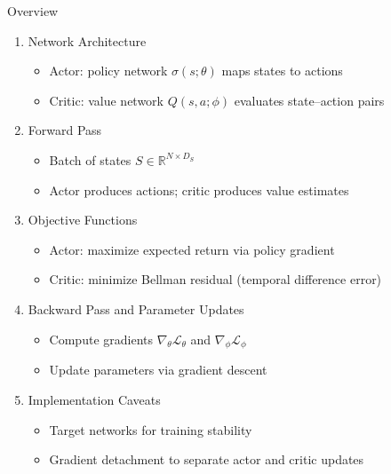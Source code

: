 \documentclass[aspectratio=169]{beamer}
\newcommand{\1}{\mathbf{1}}
\begin{document}
    \begin{frame}{Overview}
      \small
      \begin{enumerate}
          \item Network Architecture
          \begin{itemize}
              \item Actor: policy network $\sigma(s;\theta)$ maps states to actions
              \item Critic: value network $Q(s,a;\phi)$ evaluates state--action pairs
          \end{itemize}
          \item Forward Pass
          \begin{itemize}
              \item Batch of states $S \in \mathbb{R}^{N \times D_S}$
              \item Actor produces actions; critic produces value estimates
          \end{itemize}
          \item Objective Functions
          \begin{itemize}
              \item Actor: maximize expected return via policy gradient
              \item Critic: minimize Bellman residual (temporal difference error)
          \end{itemize}
          \item Backward Pass and Parameter Updates
          \begin{itemize}
              \item Compute gradients $\nabla_\theta \mathcal{L}_\theta$ and $\nabla_\phi \mathcal{L}_\phi$
              \item Update parameters via gradient descent
          \end{itemize}
          \item Implementation Caveats
          \begin{itemize}
              \item Target networks for training stability
              \item Gradient detachment to separate actor and critic updates
          \end{itemize}
      \end{enumerate}
      \end{frame}
\end{document}
